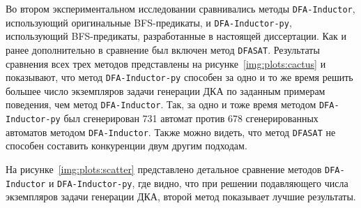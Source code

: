 \begin{table}[ht]
  \caption{Медианное время работы методов генерации ДКА по заданным примерам поведения с использованием BFS-предикатов нарушения симметрии, DFS-предикатов нарушения симметрии и метода \texttt{DFASAT} в секундах.}
  \centering
  \label{tab:DFS-results}
\end{table}

Во втором экспериментальном исследовании сравнивались методы \texttt{DFA-Inductor}, использующий оригинальные BFS-предикаты, и \texttt{DFA-Inductor-py}, использующий BFS-предикаты, разработанные в настоящей диссертации.
Как и ранее дополнительно в сравнение был включен метод \texttt{DFASAT}.
Результаты сравнения всех трех методов представлены на рисунке~\ref{img:plots:cactus} и показывают, что метод \texttt{DFA-Inductor-py} способен за одно и то же время решить большее число экземпляров задачи генерации ДКА по заданным примерам поведения, чем метод \texttt{DFA-Inductor}.
Так, за одно и тоже время методом \texttt{DFA-Inductor-py} был сгенерирован 731 автомат против 678 сгенерированных автоматов методом \texttt{DFA-Inductor}.
Также можно видеть, что метод \texttt{DFASAT} не способен составить конкуренции двум другим подходам.

На рисунке~\ref{img:plots:scatter} представлено детальное сравнение методов \texttt{DFA-Inductor} и \texttt{DFA-Inductor-py}, где видно, что при решении подавляющего числа экземпляров задачи генерации ДКА, второй метод показывает лучшие результаты.

